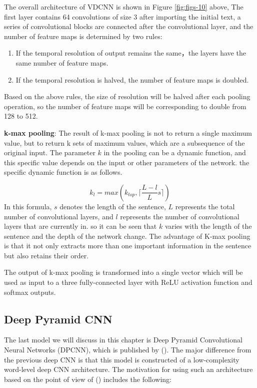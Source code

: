 \documentclass[]{krantz}
\providecommand{\tightlist}{%
  \setlength{\itemsep}{0pt}\setlength{\parskip}{0pt}}
\begin{document}
The overall architecture of VDCNN is shown in Figure \ref{fig:figs-10} above, The first layer contains 64 convolutions of size 3 after importing the initial text, a series of convolutional blocks are connected after the convolutional layer, and the number of feature maps is determined by two rules:

\begin{enumerate}
\def\labelenumi{\arabic{enumi}.}
\tightlist
\item
  If the temporal resolution of output remains the same，the layers have the same number of feature maps.
\item
  If the temporal resolution is halved, the number of feature maps is doubled.
\end{enumerate}

Based on the above rules, the size of resolution will be halved after each pooling operation, so the number of feature maps will be corresponding to double from 128 to 512.

\textbf{k-max pooling}: The result of k-max pooling is not to return a single maximum value, but to return k sets of maximum values, which are a subsequence of the original input. The parameter \(k\) in the pooling can be a dynamic function, and this specific value depends on the input or other parameters of the network. the specific dynamic function is as follows.

\[k_{l}=max(k_{top},\lceil \frac{L-l}{L}s \rceil)\]
In this formula, \(s\) denotes the length of the sentence, \(L\) represents the total number of convolutional layers, and \(l\) represents the number of convolutional layers that are currently in. so it can be seen that \(k\) varies with the length of the sentence and the depth of the network change. The advantage of K-max pooling is that it not only extracts more than one important information in the sentence but also retains their order.

The output of k-max pooling is transformed into a single vector which will be used as input to a three fully-connected layer with ReLU activation function and softmax outputs.

\hypertarget{deep-pyramid-cnn}{%
\subsection{Deep Pyramid CNN}\label{deep-pyramid-cnn}}

The last model we will discuss in this chapter is Deep Pyramid Convolutional Neural Networks (DPCNN), which is published by (\citet{Johnson2017DeepPC}). The major difference from the previous deep CNN is that this model is constructed of a low-complexity word-level deep CNN architecture. The motivation for using such an architecture based on the point of view of (\citet{Johnson2017DeepPC}) includes the following:
\end{document}
